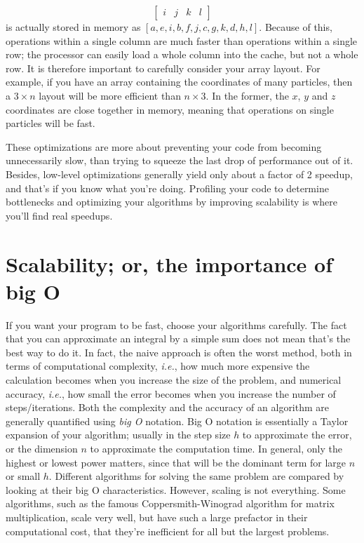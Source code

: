 \documentclass[openany,oneside]{report}
\begin{document}
\begin{itemize}
\begin{equation*}
\begin{bmatrix}
        i & j & k & l
    \end{bmatrix}
    \end{equation*}
    is actually stored in memory as $\left[a,e,i,b,f,j,c,g,k,d,h,l\right]$.
    Because of this, operations within a single column are much faster than operations within a single row; the processor can easily load a whole column into the cache, but not a whole row.
    It is therefore important to carefully consider your array layout.
    For example, if you have an array containing the coordinates of many particles, then a $3\times n$ layout will be more efficient than $n\times 3$.
    In the former, the $x$, $y$ and $z$ coordinates are close together in memory, meaning that operations on single particles will be fast.
\end{itemize}
These optimizations are more about preventing your code from becoming unnecessarily slow, than trying to squeeze the last drop of performance out of it.
Besides, low-level optimizations generally yield only about a factor of 2 speedup, and that's if you know what you're doing.
Profiling your code to determine bottlenecks and optimizing your algorithms by improving scalability is where you'll find real speedups.

\section{Scalability; or, the importance of big O}

If you want your program to be fast, choose your algorithms carefully.
The fact that you can approximate an integral by a simple sum does not mean that's the best way to do it.
In fact, the naive approach is often the worst method, both in terms of computational complexity, \emph{i.e.}, how much more expensive the calculation becomes when you increase the size of the problem, and numerical accuracy, \emph{i.e.}, how small the error becomes when you increase the number of steps/iterations.
Both the complexity and the accuracy of an algorithm are generally quantified using \emph{big O} notation.
Big O notation is essentially a Taylor expansion of your algorithm; usually in the step size $h$ to approximate the error, or the dimension $n$ to approximate the computation time.
In general, only the highest or lowest power matters, since that will be the dominant term for large $n$ or small $h$.
Different algorithms for solving the same problem are compared by looking at their big O characteristics.
However, scaling is not everything.
Some algorithms, such as the famous Coppersmith-Winograd algorithm for matrix multiplication, scale very well, but have such a large prefactor in their computational cost, that they're inefficient for all but the largest problems.
\end{document}
